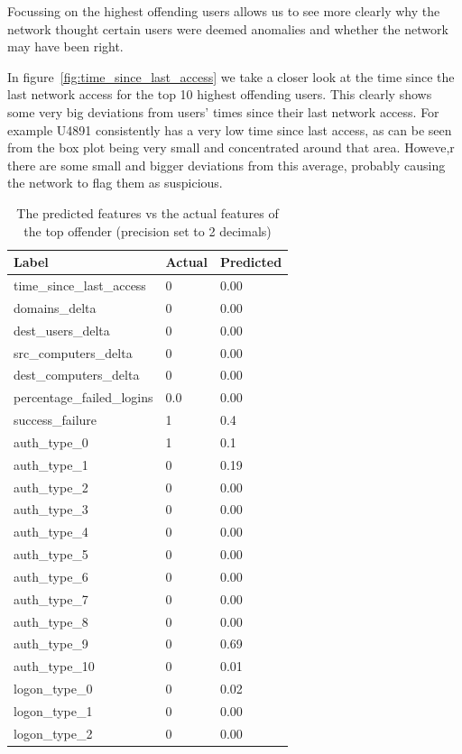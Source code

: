 Focussing on the highest offending users allows us to see more clearly why the network thought certain users were deemed anomalies and whether the network may have been right.

In figure~\ref{fig:time_since_last_access} we take a closer look at the time since the last network access for the top 10 highest offending users. This clearly shows some very big deviations from users' times since their last network access. For example U4891 consistently has a very low time since last access, as can be seen from the box plot being very small and concentrated around that area. Howeve,r there are some small and bigger deviations from this average, probably causing the network to flag them as suspicious.

\begin{table}[htbp]
	\centering
	\caption{The predicted features vs the actual features of the top offender (precision set to 2 decimals)}\label{tab:predicted_vs_actual_top}
	\begin{tabular}{lll}
		Label & Actual & Predicted \\ \midrule
		time\_since\_last\_access & 0 & 0.00 \\
		domains\_delta & 0 & 0.00 \\
		dest\_users\_delta & 0 & 0.00 \\
		src\_computers\_delta & 0 & 0.00 \\
		dest\_computers\_delta & 0 & 0.00 \\
		percentage\_failed\_logins & 0.0 & 0.00 \\
		success\_failure & 1 & 0.4 \\
		auth\_type\_0 & 1 & 0.1 \\
		auth\_type\_1 & 0 & 0.19 \\
		auth\_type\_2 & 0 & 0.00 \\
		auth\_type\_3 & 0 & 0.00 \\
		auth\_type\_4 & 0 & 0.00 \\
		auth\_type\_5 & 0 & 0.00 \\
		auth\_type\_6 & 0 & 0.00 \\
		auth\_type\_7 & 0 & 0.00 \\
		auth\_type\_8 & 0 & 0.00 \\
		auth\_type\_9 & 0 & 0.69 \\
		auth\_type\_10 & 0 & 0.01 \\
		logon\_type\_0 & 0 & 0.02 \\
		logon\_type\_1 & 0 & 0.00 \\
		logon\_type\_2 & 0 & 0.00 \\

\end{tabular}
\end{table}

